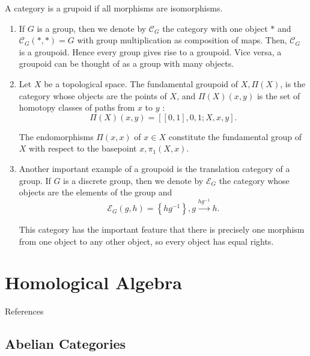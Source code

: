 A category is a grupoid if all morphisms are isomorphisms.

\begin{example}
    \begin{enumerate}
        \item If $G$ is a group, then we denote by $\mathcal{C}_G$ the category with one object $*$ and $\mathcal{C}_G(*, *)=G$ with group multiplication as composition of maps. Then, $\mathcal{C}_G$ is a groupoid. Hence every group gives rise to a groupoid. Vice versa, a groupoid can be thought of as a group with many objects.
        \item Let $X$ be a topological space. The fundamental groupoid of $X, \Pi(X)$, is the category whose objects are the points of $X$, and $\Pi(X)(x, y)$ is the set of homotopy classes of paths from $x$ to $y$ :
        $$
        \Pi(X)(x, y)=[[0,1], 0,1 ; X, x, y] .
        $$
        
        The endomorphisms $\Pi(x, x)$ of $x \in X$ constitute the fundamental group of $X$ with respect to the basepoint $x, \pi_1(X, x)$.
        \item Another important example of a groupoid is the translation category of a group. If $G$ is a discrete group, then we denote by $\mathcal{E}_G$ the category whose objects are the elements of the group and $$\mathcal{E}_G(g, h)=\left\{h g^{-1}\right\}, g \xrightarrow{h g^{-1}} h.$$

        This category has the important feature that there is precisely one morphism from one object to any other object, so every object has equal rights.

    \end{enumerate}
\end{example}










\chapter{Homological Algebra}

References \cite{richterCategoriesHomotopyTheory2020,weibelKbookIntroductionAlgebraic2013a}
\section{Abelian Categories}




